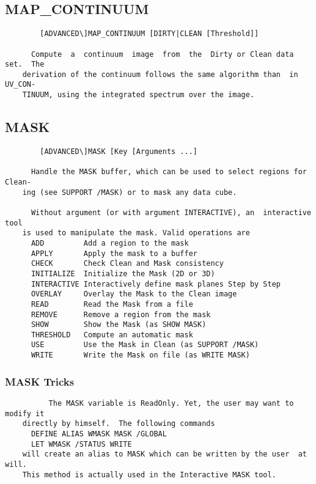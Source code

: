 \subsection{MAP\_CONTINUUM}
\begin{verbatim}
        [ADVANCED\]MAP_CONTINUUM [DIRTY|CLEAN [Threshold]]

      Compute  a  continuum  image  from  the  Dirty or Clean data set.  The
    derivation of the continuum follows the same algorithm than  in  UV_CON-
    TINUUM, using the integrated spectrum over the image.

\end{verbatim}
\subsection{MASK}
\begin{verbatim}
        [ADVANCED\]MASK [Key [Arguments ...]

      Handle the MASK buffer, which can be used to select regions for Clean-
    ing (see SUPPORT /MASK) or to mask any data cube.

      Without argument (or with argument INTERACTIVE), an  interactive  tool
    is used to manipulate the mask. Valid operations are
      ADD         Add a region to the mask
      APPLY       Apply the mask to a buffer
      CHECK       Check Clean and Mask consistency
      INITIALIZE  Initialize the Mask (2D or 3D)
      INTERACTIVE Interactively define mask planes Step by Step
      OVERLAY     Overlay the Mask to the Clean image
      READ        Read the Mask from a file
      REMOVE      Remove a region from the mask
      SHOW        Show the Mask (as SHOW MASK)
      THRESHOLD   Compute an automatic mask
      USE         Use the Mask in Clean (as SUPPORT /MASK)
      WRITE       Write the Mask on file (as WRITE MASK)

\end{verbatim}
\subsubsection{MASK Tricks}
\begin{verbatim}
          The MASK variable is ReadOnly. Yet, the user may want to modify it
    directly by himself.  The following commands
      DEFINE ALIAS WMASK MASK /GLOBAL
      LET WMASK /STATUS WRITE
    will create an alias to MASK which can be written by the user  at  will.
    This method is actually used in the Interactive MASK tool.

\end{verbatim}
